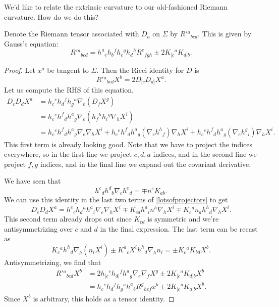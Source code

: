 We'd like to relate the extrinsic curvature to our old-fashioned Riemann curvature. How do we do this?
\begin{prop}
    Denote the Riemann tensor associated with $D_a$ on $\Sigma$ by $R'{}^a{}_{bcd}$. This is given by Gauss's equation:
    \begin{equation}
        R'{}^a{}_{bcd}=h^a{}_e h_b{}^f h_c{}^g h_d{}^h R^e{}_{fgh} \pm 2K_{[c}{}^a K_{d]b}.
    \end{equation}
\end{prop}
\begin{proof}
    Let $x^a$ be tangent to $\Sigma$. Then the Ricci identity for $D$ is
    \begin{equation}
        R'{}^a{}_{bcd} X^b = 2 D_{[c}D_{d]}X^a.
    \end{equation}
    Let us compute the RHS of this equation.
    \begin{align}
        D_c D_d X^a &= h_c{}^e h_d{}^f h_g{}^a \nabla_e(D_f X^g)\\
        &= h_c{}^e h^f{}_d h^a{}_g \nabla_e (h_f{}^h h_i{}^g \nabla_h X^i)\\
        &=h_c{}^e h^f{}_d h^a{}_g \nabla_e \nabla_h X^i 
        + h_c{}^e h^f{}_d h^a{}_g (\nabla_e h^h{}_f) \nabla_h X^i 
        + h_c{}^e h^f{}_d h^a{}_g (\nabla_e h^g{}_i) \nabla_h X^i.\label{lotsofprojectors}
    \end{align}
    This first term is already looking good. Note that we have to project the indices everywhere, so in the first line we project $c,d,a$ indices, and in the second line we project $f,g$ indices, and in the final line we expand out the covariant derivative.
    
    We have seen that
    \begin{equation}\label{projectorsandcurvature}
        h^c{}_d h^d{}_b \nabla_c h^e{}_d = \mp n^e K_{ab}.
    \end{equation}
    We can use this identity in the last two terms of \ref{lotsofprojectors} to get
    \begin{equation}
        D_c D_d X^a = h^e{}_c h_d{}^h h^a{}_i \nabla_e \nabla_h X^i \mp K_{cd} h^a{}_i n^h \nabla_h X^i \mp K_c{}^a n_a h^h{}_d \nabla_h X^i.
    \end{equation}
    This second term already drops out since $K_{cd}$ is symmetric and we're antisymmetrizing over $c$ and $d$ in the final expression. The last term can be recast as
    \begin{equation}
        K_c{}^a h^h{}_d \nabla_h(n_i X^i)\pm K^a{}_c X^i h^h{}_d \nabla_h n_i = \pm K_c{}^a K_{bd}X^b.
    \end{equation}
    Antisymmetrizing, we find that
    \begin{align*}
        R'{}^a{}_{bcd} X^b &= 2h_{[c}{}^e h_{d]}{}^f h^a{}_g \nabla_e \nabla_f X^g \pm 2 K_{[c}{}^a K_{d]b} X^b\\
        &= h_c{}^e h_d{}^f h_g{}^a h^a{}_b R^g{}_{hef} x^b \pm 2 K_{[c}{}^a K_{a]b}X^b.
    \end{align*}
    Since $X^b$ is arbitrary, this holds as a tensor identity.
\end{proof}
